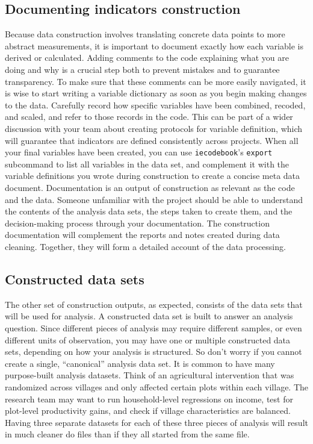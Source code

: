 \subsection{Documenting indicators construction}

Because data construction involves translating concrete data points to more abstract measurements, 
it is important to document exactly how each variable is derived or calculated.
Adding comments to the code explaining what you are doing and why is a crucial step both to prevent mistakes and to guarantee transparency.
To make sure that these comments can be more easily navigated, 
it is wise to start writing a variable dictionary as soon as you begin making changes to the data.
Carefully record how specific variables have been combined, recoded, and scaled,
and refer to those records in the code. 
This can be part of a wider discussion with your team about creating protocols for variable definition, 
which will guarantee that indicators are defined consistently across projects.
When all your final variables have been created, 
you can use \texttt{iecodebook}'s \texttt{export} subcommand to list all variables in the data set, 
and complement it with the variable definitions you wrote during construction to create a concise meta data document.
Documentation is an output of construction as relevant as the code and the data.
Someone unfamiliar with the project should be able to understand the contents of the analysis data sets, 
the steps taken to create them, 
and the decision-making process through your documentation.
The construction documentation will complement the reports and notes created during data cleaning.
Together, they will form a detailed account of the data processing.

\subsection{Constructed data sets}

The other set of construction outputs, as expected, 
consists of the data sets that will be used for analysis.
A constructed data set is built to answer an analysis question.
Since different pieces of analysis may require different samples, 
or even different units of observation,
you may have one or multiple constructed data sets, 
depending on how your analysis is structured.
So don't worry if you cannot create a single, ``canonical'' analysis data set.
It is common to have many purpose-built analysis datasets.
Think of an agricultural intervention that was randomized across villages 
and only affected certain plots within each village. 
The research team may want to run household-level regressions on income, 
test for plot-level productivity gains, 
and check if village characteristics are balanced.
Having three separate datasets for each of these three pieces of analysis 
will result in much cleaner do files than if they all started from the same file. 

